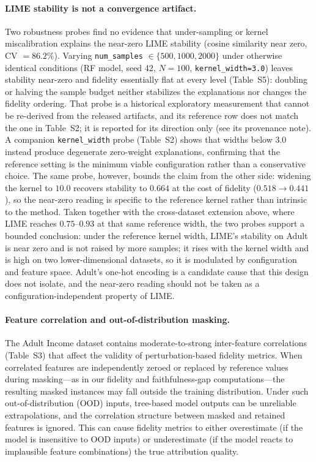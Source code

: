 \documentclass[10pt,a4paper,twoside]{article}
\begin{document}
\paragraph{LIME stability is not a convergence artifact.}
Two robustness probes find no evidence that under-sampling or kernel
miscalibration explains the near-zero LIME stability (cosine similarity near
zero, CV $= 86.2\%$). Varying \texttt{num\_samples} $\in
\{500, 1000, 2000\}$ under otherwise identical conditions (RF model, seed
42, $N=100$, \texttt{kernel\_width=3.0}) leaves stability near-zero and
fidelity essentially flat at every level (Table~S5):
doubling or halving the sample budget neither stabilizes the explanations
nor changes the fidelity ordering. That probe is a historical exploratory
measurement that cannot be re-derived from the released artifacts, and its
reference row does not match the one in Table~S2; it is reported for its
direction only (see its provenance note). A companion \texttt{kernel\_width}
probe (Table~S2) shows that widths below $3.0$ instead
produce degenerate zero-weight explanations, confirming that the
reference setting is the minimum viable configuration rather than a
conservative choice. The same probe, however, bounds the claim from the
other side: widening the kernel to $10.0$ recovers stability to $0.664$
at the cost of fidelity ($0.518 \rightarrow 0.441$), so the near-zero
reading is specific to the reference kernel rather than intrinsic to the
method. Taken together with the cross-dataset extension above, where LIME
reaches $0.75$--$0.93$ at that same reference width, the two probes
support a bounded conclusion: under the reference kernel width, LIME's
stability on Adult is near zero and is not raised by more samples; it rises
with the kernel width and is high on two lower-dimensional datasets, so it
is modulated by configuration and feature space. Adult's one-hot encoding
is a candidate cause that this design does not isolate, and the near-zero
reading should not be taken as a configuration-independent property of
LIME.

\paragraph{Feature correlation and out-of-distribution masking.}
The Adult Income dataset contains moderate-to-strong inter-feature
correlations (Table~S3) that affect the validity of
perturbation-based fidelity metrics. When correlated features are
independently zeroed or replaced by reference values during
masking---as in our fidelity and faithfulness-gap computations---the
resulting masked instances may fall outside the training distribution.
Under such out-of-distribution (OOD) inputs, tree-based model outputs can
be unreliable extrapolations, and the correlation structure between
masked and retained features is ignored. This can cause fidelity metrics
to either overestimate (if the model is insensitive to OOD inputs) or
underestimate (if the model reacts to implausible feature combinations)
the true attribution quality.
\end{document}
